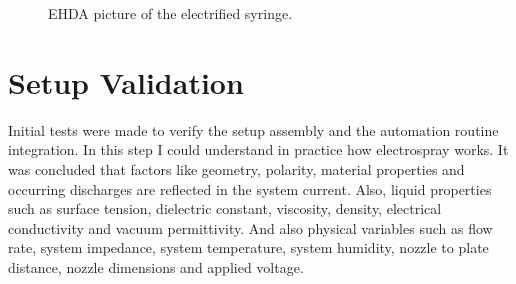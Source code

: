 \begin{figure}[H]
    \centering
    \caption{EHDA picture of the electrified syringe.}
\end{figure}







\section{Setup Validation}
\label{sec:setup_validation}


Initial tests were made to verify the setup assembly and the automation routine integration. In this step I could understand in practice how electrospray works.
It was concluded that factors like geometry, polarity, material properties and occurring discharges are reflected in the system current.
Also, liquid properties such as surface tension, dielectric constant, viscosity, density, electrical conductivity and vacuum permittivity. 
 And also physical variables such as flow rate, system impedance, system temperature, system humidity, nozzle to plate distance, nozzle dimensions and applied voltage.



